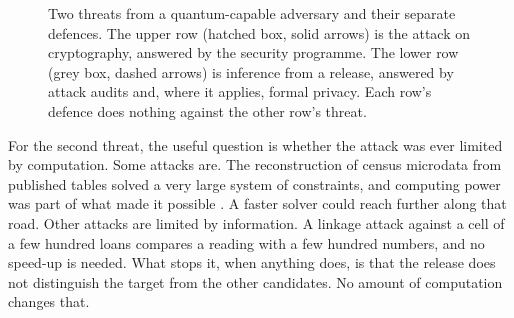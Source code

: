 \begin{figure}[ht]
\centering
{}
\caption{Two threats from a quantum-capable adversary and their separate defences. The upper row
(hatched box, solid arrows) is the attack on cryptography, answered by the security programme. The
lower row (grey box, dashed arrows) is inference from a release, answered by attack audits and, where it
applies, formal privacy. Each row's defence does nothing against the other row's threat.}
\label{c21:fig-threats}
\end{figure}

For the second threat, the useful question is whether the attack was ever limited by computation.
Some attacks are. The reconstruction of census microdata from published tables solved a very large
system of constraints, and computing power was part of what made it possible
\citep{garfinkel2019,abowd2022}. A faster solver could reach further along that road. Other attacks
are limited by information. A linkage attack against a cell of a few hundred loans compares a
reading with a few hundred numbers, and no speed-up is needed. What stops it, when anything does,
is that the release does not distinguish the target from the other candidates. No amount of
computation changes that.

